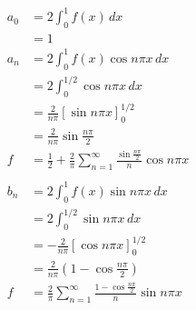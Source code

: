 \documentclass{article}
\begin{document}
\setcounter{subsubsection}{24}
\subsubsection{}

\begin{align*}
  a_0 & = 2 \int_0^1 f(x) \,d x                                                                       \\
      & = 1                                                                                           \\
  a_n & = 2 \int_0^1 f(x) \cos n \pi x \,d x                                                          \\
      & = 2 \int_0^{1 / 2} \cos n \pi x \,d x                                                         \\
      & = \frac{2}{n \pi} [\sin n \pi x]_0^{1 / 2}                                                    \\
      & = \frac{2}{n \pi} \sin \frac{n \pi}{2}                                                        \\
  f   & = \frac{1}{2} + \frac{2}{\pi} \sum_{n = 1}^\infty \frac{\sin \frac{n \pi}{2}}{n} \cos n \pi x \\ \\
  b_n & = 2 \int_0^1 f(x) \sin n \pi x \,d x                                                          \\
      & = 2 \int_0^{1 / 2} \sin n \pi x \,d x                                                         \\
      & = -\frac{2}{n \pi} [\cos n \pi x]_0^{1 / 2}                                                   \\
      & = \frac{2}{n \pi} \left( 1 - \cos \frac{n \pi}{2} \right)                                     \\
  f   & = \frac{2}{\pi} \sum_{n = 1}^\infty \frac{1 - \cos \frac{n \pi}{2}}{n} \sin n \pi x
\end{align*}

\setcounter{subsubsection}{26}
\subsubsection{}
\end{document}
